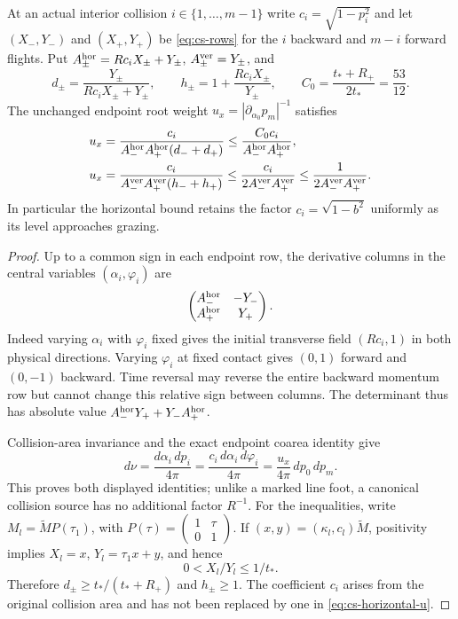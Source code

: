 \begin{lemma}
\label{lem:cs-determinant}
At an actual interior collision $i\in\{1,\ldots,m-1\}$ write
$c_i=\sqrt{1-p_i^2}$ and let $(X_-,Y_-)$ and $(X_+,Y_+)$ be
\eqref{eq:cs-rows} for the $i$ backward and $m-i$ forward flights.
Put $A_\pm^{\rm hor}=Rc_iX_\pm+Y_\pm$,
$A_\pm^{\rm ver}=Y_\pm$, and
\[
 d_\pm=\frac{Y_\pm}{Rc_iX_\pm+Y_\pm},\qquad
 h_\pm=1+\frac{Rc_iX_\pm}{Y_\pm},\qquad
 C_0=\frac{t_*+R_+}{2t_*}=\frac{53}{12}.
\]
The unchanged endpoint root weight
$u_x=|\partial_{\alpha_0}p_m|^{-1}$ satisfies
\begin{align}
 u_x&=\frac{c_i}{A_-^{\rm hor}A_+^{\rm hor}(d_-+d_+)}
       \le\frac{C_0c_i}{A_-^{\rm hor}A_+^{\rm hor}},
                                                        \label{eq:cs-horizontal-u}\\
 u_x&=\frac{c_i}{A_-^{\rm ver}A_+^{\rm ver}(h_-+h_+)}
       \le\frac{c_i}{2A_-^{\rm ver}A_+^{\rm ver}}
       \le\frac1{2A_-^{\rm ver}A_+^{\rm ver}}.
                                                        \label{eq:cs-vertical-u}
\end{align}
In particular the horizontal bound retains the factor
$c_i=\sqrt{1-b^2}$ uniformly as its level approaches grazing.
\end{lemma}
\begin{proof}
Up to a common sign in each endpoint row, the derivative columns
in the central variables $(\alpha_i,\varphi_i)$ are
\[
 \begin{pmatrix}
       A_-^{\rm hor}&-Y_-\\
       A_+^{\rm hor}& Y_+
 \end{pmatrix}.
\]
Indeed varying $\alpha_i$ with $\varphi_i$ fixed gives the
initial transverse field $(Rc_i,1)$ in both physical directions.
Varying $\varphi_i$ at fixed contact gives $(0,1)$ forward and
$(0,-1)$ backward.  Time reversal may reverse the entire backward
momentum row but cannot change this relative sign between columns.
The determinant thus has absolute value
$A_-^{\rm hor}Y_++Y_-A_+^{\rm hor}$.

Collision-area invariance and the exact endpoint coarea identity give
\[
 d\nu=\frac{d\alpha_i\,dp_i}{4\pi}
      =\frac{c_i\,d\alpha_i\,d\varphi_i}{4\pi}
      =\frac{u_x}{4\pi}\,dp_0\,dp_m.
\]
This proves both displayed identities; unlike a marked line foot,
a canonical collision source has no additional factor $R^{-1}$.
For the inequalities, write $M_l=\widetilde M P(\tau_1)$, with
$P(\tau)=\left(\begin{smallmatrix}1&\tau\\0&1\end{smallmatrix}\right)$.
If $(x,y)=(\kappa_l,c_l)\widetilde M$, positivity implies
$X_l=x$, $Y_l=\tau_1x+y$, and hence
\[
       0< X_l/Y_l\le1/t_*.
\]
Therefore $d_\pm\ge t_* /(t_*+R_+)$ and $h_\pm\ge1$.
The coefficient $c_i$ arises from the original collision area and
has not been replaced by one in \eqref{eq:cs-horizontal-u}.
\end{proof}

